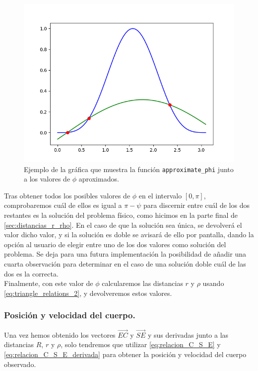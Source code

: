 \documentclass[11pt]{book}
\begin{document}
\begin{figure}[H]
\centering
\includegraphics[scale=0.6]{images/example_newton.png}
\caption{Ejemplo de la gráfica que muestra la función \texttt{approximate\_phi} junto a los valores de $\phi$ aproximados.}
\end{figure}

Tras obtener todos los posibles valores de $\phi$ en el intervalo $[0,\pi]$, comprobaremos cuál de ellos es igual a $\pi-\psi$ para discernir entre cuál de los dos restantes es la solución del problema físico, como hicimos en la parte final de \ref{sec:distancias_r_rho}. En el caso de que la solución sea única, se devolverá el valor dicho valor, y si la solución es doble se avisará de ello por pantalla, dando la opción al usuario de elegir entre uno de los dos valores como solución del problema. Se deja para una futura implementación la posibilidad de añadir una cuarta observación para determinar en el caso de una solución doble cuál de las dos es la correcta.\\

Finalmente, con este valor de $\phi$ calcularemos las distancias $r$ y $\rho$ usando \eqref{eq:triangle_relations_2}, y devolveremos estos valores.\\

\subsubsection{Posición y velocidad del cuerpo.}
Una vez hemos obtenido los vectores $\overrightarrow{EC}$ y $\overrightarrow{SE}$ y sus derivadas junto a las distancias $R$, $r$ y $\rho$, solo tendremos que utilizar \eqref{eq:relacion_C_S_E} y \eqref{eq:relacion_C_S_E_derivada} para obtener la posición y velocidad del cuerpo observado.\\
\end{document}
